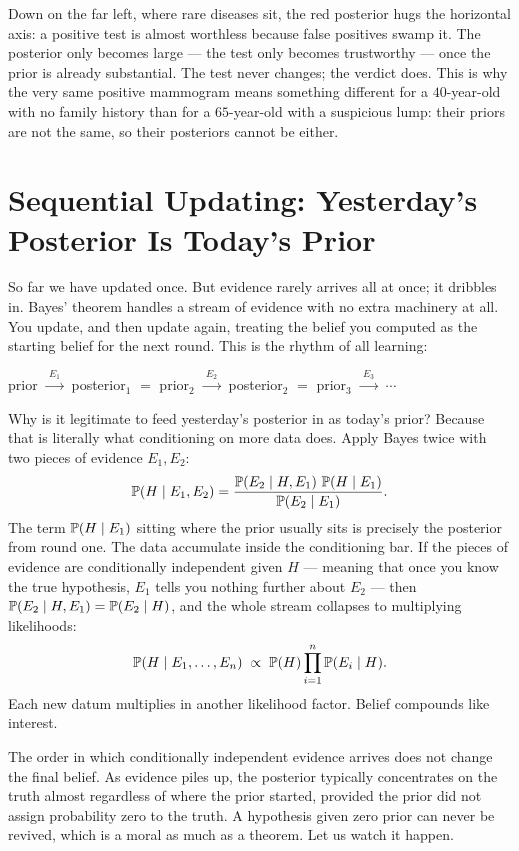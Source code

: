 Down on the far left,
where rare diseases sit, the red posterior hugs the horizontal axis: a positive test is almost
worthless because false positives swamp it. The posterior only becomes large --- the test
only becomes trustworthy --- once the prior is already substantial. The test never
changes; the verdict does. This is why the very same positive mammogram means something
different for a $40$-year-old with no family history than for a $65$-year-old with a
suspicious lump: their priors are not the same, so their posteriors cannot be either.

\section{Sequential Updating: Yesterday's Posterior Is Today's Prior}
\label{ch05:sequential}

So far we have updated once. But evidence rarely arrives all at once; it dribbles in.
Bayes' theorem handles a stream of evidence with no extra machinery
at all. You update, and then update again, treating the belief you computed as
the starting belief for the next round. This is the rhythm of all learning:

\begin{center}
prior $\xrightarrow{\;E_1\;}$ posterior$_1$ $=$ prior$_2$
$\xrightarrow{\;E_2\;}$ posterior$_2$ $=$ prior$_3$
$\xrightarrow{\;E_3\;}$ $\cdots$
\end{center}

\begin{whybox}
Why is it legitimate to feed yesterday's posterior in as today's prior? Because that is
literally what conditioning on more data does. Apply Bayes twice with two pieces of
evidence $E_1, E_2$:
\[
  \operatorname{\mathbb{P}}(H \mid E_1, E_2) = \frac{\operatorname{\mathbb{P}}(E_2 \mid H, E_1)\,\operatorname{\mathbb{P}}(H \mid E_1)}{\operatorname{\mathbb{P}}(E_2\mid E_1)}.
\]
The term $\operatorname{\mathbb{P}}(H \mid E_1)$ sitting where the prior usually sits is precisely the
posterior from round one. The data accumulate inside the conditioning bar. If the
pieces of evidence are conditionally independent given $H$ --- meaning that once you know
the true hypothesis, $E_1$ tells you nothing further about $E_2$ --- then
$\operatorname{\mathbb{P}}(E_2 \mid H, E_1) = \operatorname{\mathbb{P}}(E_2 \mid H)$, and the whole stream collapses to multiplying
likelihoods:
\[
  \operatorname{\mathbb{P}}(H \mid E_1, \dots, E_n) \;\propto\; \operatorname{\mathbb{P}}(H)\prod_{i=1}^{n}\operatorname{\mathbb{P}}(E_i \mid H).
\]
Each new datum multiplies in another likelihood factor. Belief compounds like
interest.
\end{whybox}

The order in which conditionally independent evidence arrives does not change the final
belief. As evidence piles up, the posterior typically concentrates on the truth almost
regardless of where the prior started, provided the prior did not assign probability zero
to the truth. A hypothesis given zero prior can never be revived, which is a moral as much
as a theorem. Let us watch it happen.

